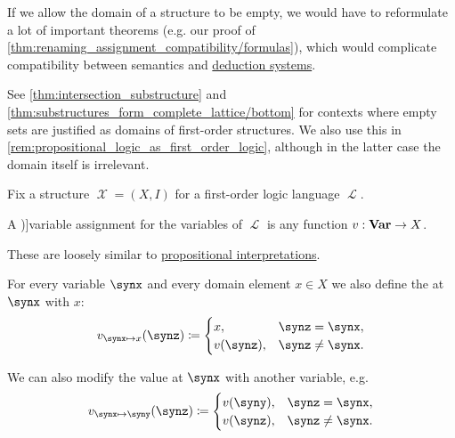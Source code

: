 \begin{remark}\label{rem:empty_first_order_structures}
   If we allow the domain of a structure to be empty, we would have to reformulate a lot of important theorems (e.g. our proof of \cref{thm:renaming_assignment_compatibility/formulas}), which would complicate compatibility between semantics and \hyperref[def:deduction_system]{deduction systems}.

   See \cref{thm:intersection_substructure} and \cref{thm:substructures_form_complete_lattice/bottom} for contexts where empty sets are justified as domains of first-order structures. We also use this in \cref{rem:propositional_logic_as_first_order_logic}, although in the latter case the domain itself is irrelevant.
\end{remark}

\begin{definition}\label{def:first_order_valuation}
  Fix a structure \( \mscrX = (X, I) \) for a first-order logic language \( \mscrL \).

  \begin{thmenum}
     A \term[ru=оценка (\cite[77]{ШеньВерещагин2017ЯзыкиИИсчисления})]{variable assignment} for the variables of \( \mscrL \) is any function \( v: \op*{Var} \to X \).

    These are loosely similar to \hyperref[def:propositional_valuation/interpretation]{propositional interpretations}.

     For every variable \( \synx \) and every domain element \( x \in X \) we also define the  at \( \synx \) with \( x \):
    \begin{equation*}
      v_{\synx \mapsto x}(\synz) \coloneqq \begin{cases}
        x,        &\synz = \synx, \\
        v(\synz), &\synz \neq \synx.
      \end{cases}
    \end{equation*}

    We can also modify the value at \( \synx \) with another variable, e.g.
    \begin{equation*}
      v_{\synx \mapsto \syny}(\synz) \coloneqq \begin{cases}
        v(\syny),  &\synz = \synx, \\
        v(\synz), &\synz \neq \synx.
      \end{cases}
    \end{equation*}


\end{thmenum}
\end{definition}
